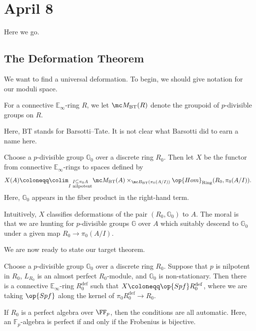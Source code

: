 \documentclass[../notes.tex]{subfiles}
\begin{document}
\section{April 8}
Here we go.

\subsection{The Deformation Theorem}
We want to find a universal deformation. To begin, we should give notation for our moduli space.
\begin{notation}
	For a connective $\mathbb E_\infty$-ring $R$, we let $\mc M_{\mathrm{BT}}(R)$ denote the groupoid of $p$-divisible groups on $R$.
\end{notation}
Here, $\mathrm{BT}$ stands for Barsotti--Tate. It is not clear what Barsotti did to earn a name here.
\begin{notation}
	Choose a $p$-divisible group $\mathbb G_0$ over a discrete ring $R_0$. Then let $X$ be the functor from connective $\mathbb E_\infty$-rings to spaces defined by
	\[X(A)\coloneqq\colim_{\substack{I\subseteq\pi_0A\\I\text{ nilpotent}}}\mc M_{\mathrm{BT}}(A)\times_{\mc B_{\mathrm{BT}}(\pi_0(A/I))}\op{Hom}_{\mathrm{Ring}}(R_0,\pi_0(A/I)).\]
	Here, $\mathbb G_0$ appears in the fiber product in the right-hand term.
\end{notation}
\begin{remark}
	Intuitively, $X$ classifies deformations of the pair $(R_0,\mathbb G_0)$ to $A$. The moral is that we are hunting for $p$-divisible groups $\mathbb G$ over $A$ which suitably descend to $\mathbb G_0$ under a given map $R_0\to\pi_0(A/I)$.
\end{remark}
We are now ready to state our target theorem.
\begin{theorem}[Lurie] \label{thm:lurie}
	Choose a $p$-divisible group $\mathbb G_0$ over a discrete ring $R_0$.
	Suppose that $p$ is nilpotent in $R_0$, $L_{R_0}$ is an almost perfect $R_0$-module, and $\mathbb G_0$ is non-stationary.
	Then there is a connective $\mathbb E_\infty$-ring $R_0^{\mathrm{def}}$ such that $X\coloneqq\op{Spf}R_0^{\mathrm{def}}$, where we are taking $\op{Spf}$ along the kernel of $\pi_0R_0^{\mathrm{def}}\to R_0$.
\end{theorem}
\begin{remark}
	If $R_0$ is a perfect algebra over $\FF_p$, then the conditions are all automatic. Here, an $\mathbb F_p$-algebra is perfect if and only if the Frobenius is bijective.
\end{remark}
\end{document}
